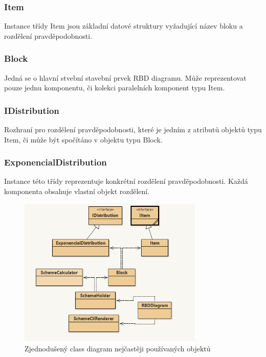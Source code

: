\documentclass[FM,RP]{tulthesis}
\begin{document}
        \subsubsection*{Item}
            Instance třídy Item jsou základní datové struktury vyžadující název bloku a rozdělení pravděpodobnosti.
        \subsubsection*{Block}
            Jedná se o hlavní stvební stavební prvek RBD diagramu. 
            Může reprezentovat pouze jednu komponentu, či kolekci paralelních komponent typu Item. 
        \subsubsection*{IDistribution}
            Rozhraní pro rozdělení pravděpodobnosti, které je jedním z atributů objektů typu Item, či může být spočítáno v objektu typu Block.
        \subsubsection*{ExponencialDistribution}
            Instance této třídy reprezentuje konkrétní rozdělení pravděpodobnosti. Každá komponenta obsahuje vlastní objekt rozdělení.
        \begin{figure}
            \begin{center}
                \includegraphics[width=250pt]{pic/class.png}
                \caption{Zjednodušený class diagram nejčastěji používaných objektů}
            \end{center}
        \end{figure}

    
\end{document}
